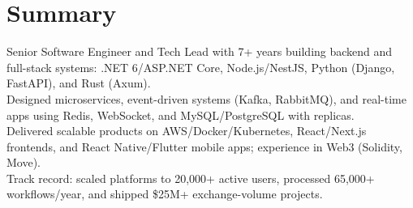 \documentclass[letterpaper,11pt]{article}
\begin{document}





\section{Summary}
  Senior Software Engineer and Tech Lead with 7+ years building backend and full-stack systems: .NET 6/ASP.NET Core, Node.js/NestJS, Python (Django, FastAPI), and Rust (Axum). \\
  Designed microservices, event-driven systems (Kafka, RabbitMQ), and real-time apps using Redis, WebSocket, and MySQL/PostgreSQL with replicas. \\
  Delivered scalable products on AWS/Docker/Kubernetes, React/Next.js frontends, and React Native/Flutter mobile apps; experience in Web3 (Solidity, Move). \\
  Track record: scaled platforms to 20,000+ active users, processed 65,000+ workflows/year, and shipped \$25M+ exchange-volume projects.









\end{document}
